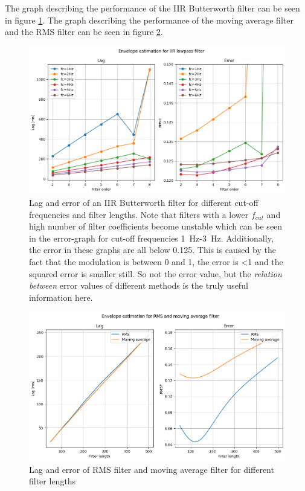 The graph describing the performance of the IIR Butterworth filter can be seen in figure \ref{fig:lagerror_iir}. The graph describing the performance of the moving average filter and the RMS filter can be seen in figure \ref{fig:lagerror_RMS_MA}.

\begin{figure}[h!t]
	\begin{center}
		\includegraphics[width=1.0\columnwidth]{images/lagerror_iirfilter.png}
	\end{center}
	\caption{Lag and error of an IIR Butterworth filter for different cut-off frequencies and filter lengths. Note that filters with a lower $f_{cut}$ and high number of filter coefficients become unstable which can be seen in the error-graph for cut-off frequencies \SI{1}{\hertz}-\SI{3}{\hertz}. Additionally, the error in these graphs are all below 0.125. This is caused by the fact that the modulation is between 0 and 1, the error is <1 and the squared error is smaller still. So not the error value, but the \textit{relation between} error values of different methods is the truly useful information here.}
	\label{fig:lagerror_iir}
\end{figure}

\begin{figure}[h!t]
	\begin{center}
		\includegraphics[width=1.0\columnwidth]{images/lagerror_rms_and_MA_filter.png}
	\end{center}
	\caption{Lag and error of RMS filter and moving average filter for different filter lengths}
	\label{fig:lagerror_RMS_MA}
\end{figure}

